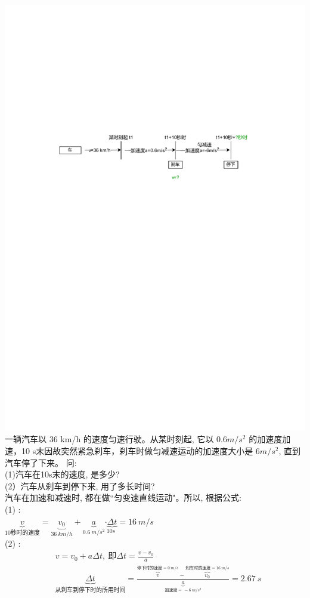 \documentclass[UTF8]{ctexart}
\begin{document}
\begin{myEnvSample}
\includegraphics[width=1\textwidth]{img/0110.pdf}\\

一辆汽车以 36 km/h 的速度匀速行驶。从某时刻起, 它以 $0.6 m/s^2$ 的加速度加速，10 s末因故突然紧急刹车，刹车时做匀减速运动的加速度大小是 $6 m/s^2$, 直到汽车停了下来。 问: \\
(1)汽车在10s末的速度, 是多少? \\
(2）汽车从刹车到停下来, 用了多长时间? \\

汽车在加速和减速时, 都在做``匀变速直线运动"。所以, 根据公式: \\
(1) : \\
$
\underset{10\text{秒时的速度}}{\underbrace{v}}=\underset{36\ km/h}{\underbrace{v_0}}+\underset{0.6\ m/s^2}{\underbrace{a}}\underset{10s}{\cdot \underbrace{\varDelta t}}=16\ m/s
$ \\

(2) :
\begin{align*}
		& v=v_0+a\varDelta t,\ \text{即}\varDelta t=\frac{v-v_0}{a}\\
	& \underset{\text{从刹车到停下时的所用时间}}{\underbrace{\varDelta t}}=\frac{\overset{\text{停下时的速度}=0\ m/s}{\overbrace{v}}-\overset{\text{刹车时的速度}=16\ m/s}{\overbrace{v_0}}}{\underset{\text{加速度}=\ -6\ m/s^2}{\underbrace{a}}}=2.67\ s
\end{align*}
\end{myEnvSample}
\end{document}
